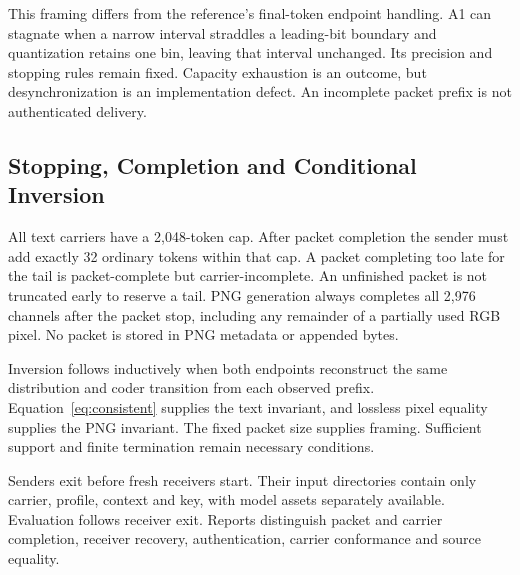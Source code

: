 This framing differs from the reference's final-token endpoint handling. A1 can stagnate when a narrow interval straddles a leading-bit boundary and quantization retains one bin, leaving that interval unchanged. Its precision and stopping rules remain fixed. Capacity exhaustion is an outcome, but desynchronization is an implementation defect. An incomplete packet prefix is not authenticated delivery.

\subsection{Stopping, Completion and Conditional Inversion}
All text carriers have a 2,048-token cap. After packet completion the sender must add exactly 32 ordinary tokens within that cap. A packet completing too late for the tail is packet-complete but carrier-incomplete. An unfinished packet is not truncated early to reserve a tail. PNG generation always completes all 2,976 channels after the packet stop, including any remainder of a partially used RGB pixel. No packet is stored in PNG metadata or appended bytes.

Inversion follows inductively when both endpoints reconstruct the same distribution and coder transition from each observed prefix. Equation~\ref{eq:consistent} supplies the text invariant, and lossless pixel equality supplies the PNG invariant. The fixed packet size supplies framing. Sufficient support and finite termination remain necessary conditions.

Senders exit before fresh receivers start. Their input directories contain only carrier, profile, context and key, with model assets separately available. Evaluation follows receiver exit. Reports distinguish packet and carrier completion, receiver recovery, authentication, carrier conformance and source equality.
